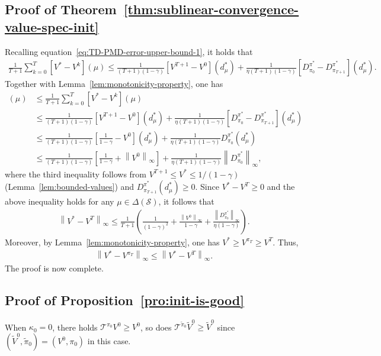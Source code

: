 \documentclass[10pt]{article}
\newcommand{\calS}{\mathcal{S}}
\newcommand{\calT}{\mathcal{T}}
\newcommand{\ls}{\left}
\newcommand{\rs}{\right}
\theoremstyle{plain}
\theoremstyle{definition}
\begin{document}
\subsection{Proof of Theorem~\ref{thm:sublinear-convergence-value-spec-init}}
\label{sec:pf:thm:sublinear-convergence-value-spec-init}
Recalling  equation~\eqref{eq:TD-PMD-error-upper-bound-1}, it holds that
\begin{align*}
    \frac{1}{T+1} \sum_{k=0}^{T} [V^* - V^k](\mu) \leq \frac{1}{(T+1)(1-\gamma)} [V^{T+1}-V^0](d^*_\mu) + \frac{1}{\eta(T+1)(1-\gamma)}[D^{\pi^*}_{\pi_0} - D^{\pi^*}_{\pi_{T+1}}](d^*_\mu).
\end{align*}
Together with Lemma~\ref{lem:monotonicity-property}, one has
\begin{align*}
    [V^* - V^T](\mu) &\leq \frac{1}{T+1} \sum_{k=0}^{T} [V^* - V^k](\mu) \\
    &\leq \frac{1}{(T+1)(1-\gamma)} [V^{T+1}-V^0](d^*_\mu) + \frac{1}{\eta(T+1)(1-\gamma)}[D^{\pi^*}_{\pi_0} - D^{\pi^*}_{\pi_{T+1}}](d^*_\mu)\\
    &\leq \frac{1}{(T+1)(1-\gamma)} \ls[ \frac{1}{1-\gamma} - V^0 \rs](d^*_\mu) + \frac{1}{\eta(T+1)(1-\gamma)} D^{\pi^*}_{\pi_0}(d^*_\mu) \\
    &\leq \frac{1}{(T+1)(1-\gamma)} \ls[\frac{1}{1-\gamma} + \ls\|V^0\rs\|_\infty \rs] + \frac{1}{\eta(T+1)(1-\gamma)} \ls\|D^{\pi^*}_{\pi_0}\rs\|_\infty,
\end{align*}
where the third inequality follows from $V^{T+1} \leq V^* \leq 1/(1-\gamma)$ (Lemma~\ref{lem:bounded-values}) and $D^{\pi^*}_{\pi_{T+1}}(d^*_\mu) \geq 0$. Since $V^* - V^T \geq 0$ and the above inequality holds for any $\mu\in \Delta(\calS)$, it follows that
\begin{align*}
    \ls\| V^* - V^T \rs\|_\infty \leq \frac{1}{T+1} \ls( \frac{1}{(1-\gamma)^2} \!+\! \frac{\ls\| V^0 \rs\|_\infty}{1-\gamma} \!+\! \frac{\ls\| D^{\pi^*}_{\pi_0} \rs\|_\infty}{\eta(1-\gamma)} \rs).
\end{align*}
Moreover, by Lemma~\ref{lem:monotonicity-property}, one has $V^* \geq V^{\pi_T} \geq V^T$. Thus,
\begin{align*}
    \ls\| V^* - V^{\pi_T} \rs\|_\infty \leq \ls\| V^* - V^T \rs\|_\infty.
\end{align*}
The proof is now complete.

\subsection{Proof of Proposition~\ref{pro:init-is-good}}
\label{sec:pf:pro:init-is-good}
When $\kappa_0=0$, there holds  $\calT^{\pi_0} V^0 \geq V^0$, so does $\calT^{\tilde{\pi}_0} \tilde{V}^0 \geq \tilde{V}^0$ since $(\tilde{V}^0,\tilde{\pi}_0)=({V}^0,{\pi}_0)$ in this case. 
\end{document}
